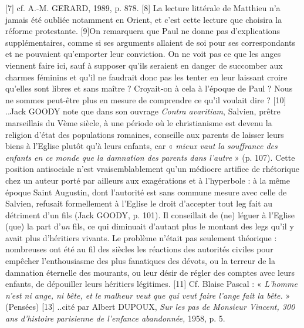 [7] cf. A.-M. GERARD, 1989, p. 878.
[8] La lecture littérale de Matthieu n'a jamais été oubliée notamment en Orient, et c'est cette lecture que choisira la réforme protestante.
[9]On remarquera que Paul ne donne pas d'explications supplémentaires, comme si ses arguments allaient de soi pour ses correspondants et ne pouvaient qu'emporter leur conviction. On ne voit pas ce que les anges viennent faire ici, sauf à supposer qu'ils seraient en danger de succomber aux charmes féminins et qu'il ne faudrait donc pas les tenter en leur laissant croire qu'elles sont libres et sans maître ? Croyait-on à cela à l'époque de Paul ? Nous ne sommes peut-être plus en mesure de comprendre ce qu'il voulait dire ? 
[10] ..Jack GOODY note que dans son ouvrage \emph{Contra avaritiam}, Salvien, prêtre marseillais du Vème siècle, à une période où le christianisme est devenu la religion d'état des populations romaines, conseille aux parents de laisser leurs biens à l'Eglise plutôt qu'à leurs enfants, car « \emph{mieux vaut la souffrance des enfants en ce monde que la damnation des parents dans l'autre} » (p. 107). Cette position antisociale n'est vraisemblablement qu'un médiocre artifice de rhétorique chez un auteur porté par ailleurs aux exagérations et à l'hyperbole : à la même époque Saint Augustin, dont l'autorité est sans commune mesure avec celle de Salvien, refusait formellement à l'Eglise le droit d'accepter tout leg fait au détriment d'un fils (Jack GOODY, p. 101). Il conseillait de (ne) léguer à l'Eglise (que) la part d'\emph{un} fils, ce qui diminuait d'autant plus le montant des legs qu'il y avait plus d'héritiers vivants. Le problème n'était pas seulement théorique : nombreuses ont été au fil des siècles les réactions des autorités civiles pour empêcher l'enthousiasme des plus fanatiques des dévots, ou la terreur de la damnation éternelle des mourants, ou leur désir de régler des comptes avec leurs enfants, de dépouiller leurs héritiers légitimes. 
[11] Cf. Blaise Pascal : « \emph{L'homme n'est ni ange, ni bête, et le malheur veut que qui veut faire l'ange fait la bête.} » (Pensées)
[13] ..cité par Albert DUPOUX, \emph{Sur les pas de Monsieur Vincent, 300 ans d'histoire parisienne de l'enfance abandonnée,} 1958, p. 5.